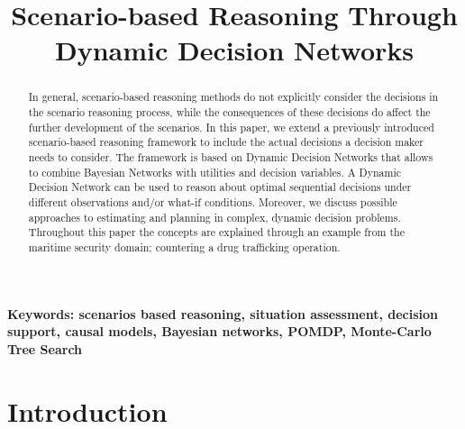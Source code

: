 \documentclass[conference]{IEEEtran}
\begin{document}
\title{Scenario-based Reasoning Through Dynamic Decision Networks}

\author{
\and
{}
\and
{}
}


\maketitle

\begin{abstract}
In general, scenario-based reasoning methods do not explicitly consider the decisions in the scenario reasoning process, while the consequences of these decisions do affect the further development of the scenarios. In this paper, we extend a previously introduced scenario-based reasoning framework to include the actual decisions a decision maker needs to consider. The framework is based on Dynamic Decision Networks that allows to combine Bayesian Networks with utilities and decision variables. A Dynamic Decision Network can be used to reason about optimal sequential decisions under different observations and/or what-if conditions. Moreover, we discuss possible approaches to estimating and planning in complex, dynamic decision problems. Throughout this paper the concepts are explained through an example from the maritime security domain; countering a drug trafficking operation.
\end{abstract}

\noindent
{\bf Keywords: scenarios based reasoning, situation assessment, decision support, causal models, Bayesian networks, POMDP, Monte-Carlo Tree Search}


\IEEEpeerreviewmaketitle

\section{Introduction}
\end{document}
